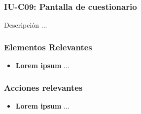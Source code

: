 
\subsubsection{IU-C09: Pantalla de cuestionario}

 Descripción ...


\subsubsection{Elementos Relevantes}

    \begin{itemize}
    \item {\bf Lorem ipsum}
        ...
    \end{itemize}

\subsubsection{Acciones relevantes}

    \begin{itemize}
    \item {\bf Lorem ipsum}
        ...
    \end{itemize}

\clearpage
